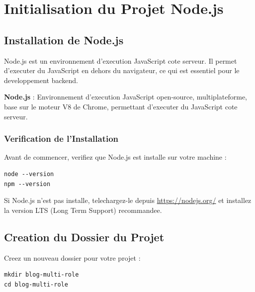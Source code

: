 \documentclass[a4paper,12pt]{book}
\begin{document}
\chapter{Initialisation du Projet Node.js}

\section{Installation de Node.js}

Node.js est un environnement d'execution JavaScript cote serveur. Il permet d'executer du JavaScript en dehors du navigateur, ce qui est essentiel pour le developpement backend.

\begin{definitionbox}
    \textbf{Node.js} : Environnement d'execution JavaScript open-source, multiplateforme, base sur le moteur V8 de Chrome, permettant d'executer du JavaScript cote serveur.
\end{definitionbox}

\subsection{Verification de l'Installation}

Avant de commencer, verifiez que Node.js est installe sur votre machine :

\begin{lstlisting}[style=bash, caption=Verification de l'installation de Node.js]
node --version
npm --version
\end{lstlisting}

Si Node.js n'est pas installe, telechargez-le depuis \url{https://nodejs.org/} et installez la version LTS (Long Term Support) recommandee.

\section{Creation du Dossier du Projet}

Creez un nouveau dossier pour votre projet :

\begin{lstlisting}[style=bash, caption=Creation du dossier du projet]
mkdir blog-multi-role
cd blog-multi-role
\end{lstlisting}
\end{document}
